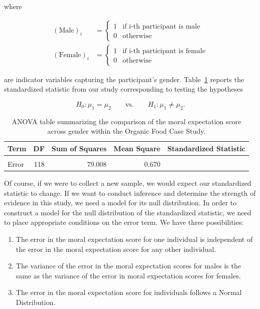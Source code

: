 \documentclass[
  letterpaper,
  DIV=11,
  numbers=noendperiod]{scrreprt}
\providecommand{\tightlist}{%
  \setlength{\itemsep}{0pt}\setlength{\parskip}{0pt}}\usepackage{longtable,booktabs,array}
\theoremstyle{definition}
\theoremstyle{definition}
\theoremstyle{plain}
\theoremstyle{remark}
\begin{document}
where

\[
\begin{aligned}
  (\text{Male})_i &= \begin{cases}
    1 & \text{if i-th participant is male} \\
    0 & \text{otherwise} 
    \end{cases} \\
  (\text{Female})_i &= \begin{cases}
    1 & \text{if i-th participant is female} \\
    0 & \text{otherwise}
    \end{cases}
\end{aligned}
\]

are indicator variables capturing the participant's gender.
Table~\ref{tbl-anovarecap-anova-table} reports the standardized
statistic from our study corresponding to testing the hypotheses

\[H_0: \mu_1 = \mu_2 \qquad \text{vs.} \qquad H_1: \mu_1 \neq \mu_2.\]

\hypertarget{tbl-anovarecap-anova-table}{}
\begin{table}
\caption{\label{tbl-anovarecap-anova-table}ANOVA table summarizing the comparison of the moral expectation score
across gender within the Organic Food Case Study. }\tabularnewline

\centering
\begin{tabular}[t]{lrrrr}
\toprule
Term & DF & Sum of Squares & Mean Square & Standardized Statistic\\
\midrule
\cellcolor{gray!6}{Gender} & \cellcolor{gray!6}{1} & \cellcolor{gray!6}{4.363} & \cellcolor{gray!6}{4.363} & \cellcolor{gray!6}{6.517}\\
Error & 118 & 79.008 & 0.670 & \\
\bottomrule
\end{tabular}
\end{table}

Of course, if we were to collect a new sample, we would expect our
standardized statistic to change. If we want to conduct inference and
determine the strength of evidence in this study, we need a model for
its null distribution. In order to construct a model for the null
distribution of the standardized statistic, we need to place appropriate
conditions on the error term. We have three possibilities:

\begin{enumerate}
\def\labelenumi{\arabic{enumi}.}
\tightlist
\item
  The error in the moral expectation score for one individual is
  independent of the error in the moral expectation score for any other
  individual.
\item
  The variance of the error in the moral expectation scores for males is
  the same as the variance of the error in moral expectation scores for
  females.
\item
  The error in the moral expectation score for individuals follows a
  Normal Distribution.
\end{enumerate}
\end{document}
